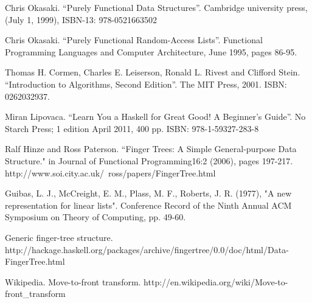 \documentclass[UTF8]{article}
\begin{document}
\begin{thebibliography}{99}

Chris Okasaki. ``Purely Functional Data Structures''. Cambridge university press, (July 1, 1999), ISBN-13: 978-0521663502

Chris Okasaki. ``Purely Functional Random-Access Lists''. Functional Programming Languages and Computer Architecture, June 1995, pages 86-95.

Thomas H. Cormen, Charles E. Leiserson, Ronald L. Rivest and Clifford Stein. ``Introduction to Algorithms, Second Edition''. The MIT Press, 2001. ISBN: 0262032937.

Miran Lipovaca. ``Learn You a Haskell for Great Good! A Beginner's Guide''. No Starch Press; 1 edition April 2011, 400 pp. ISBN: 978-1-59327-283-8

Ralf Hinze and Ross Paterson. ``Finger Trees: A Simple General-purpose Data Structure." in Journal of Functional Programming16:2 (2006), pages 197-217. http://www.soi.city.ac.uk/~ross/papers/FingerTree.html

Guibas, L. J., McCreight, E. M., Plass, M. F., Roberts, J. R. (1977), "A new representation for linear lists". Conference Record of the Ninth Annual ACM Symposium on Theory of Computing, pp. 49-60.

Generic finger-tree structure. http://hackage.haskell.org/packages/archive/fingertree/0.0/doc/html/Data-FingerTree.html

Wikipedia. Move-to-front transform. http://en.wikipedia.org/wiki/Move-to-front\_transform

\end{thebibliography}

\ifx\wholebook\relax \else
\end{document}
